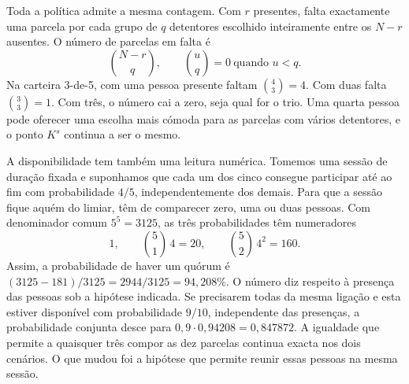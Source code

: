 Toda a política admite a mesma contagem. Com \(r\) presentes, falta
exactamente uma parcela por cada grupo de \(q\) detentores escolhido
inteiramente entre os \(N-r\) ausentes. O número de parcelas em falta é
\[
              \binom{N-r}{q},
       \qquad \binom{u}{q}=0\ \text{quando }u<q .
\]
Na carteira 3-de-5, com uma pessoa presente faltam \(\binom43=4\).
Com duas falta \(\binom33=1\). Com três, o número cai a zero,
seja qual for o trio. Uma quarta pessoa pode oferecer uma escolha
mais cómoda para as parcelas com vários detentores, e o ponto
\(K^s\) continua a ser o mesmo.

A disponibilidade tem também uma leitura numérica. Tomemos uma
sessão de duração fixada e suponhamos que cada um dos cinco consegue
participar até ao fim com probabilidade \(4/5\), independentemente
dos demais. Para que a sessão fique aquém do limiar, têm de comparecer
zero, uma ou duas pessoas. Com denominador comum \(5^5=3125\), as
três probabilidades têm numeradores
\[
             1,\qquad \binom51\,4=20,\qquad
             \binom52\,4^2=160 .
\]
Assim, a probabilidade de haver um quórum é
\((3125-181)/3125=2944/3125=94{,}208\%\).
O número diz respeito à presença das pessoas sob a hipótese indicada.
Se precisarem todas da mesma ligação e esta estiver disponível com
probabilidade \(9/10\), independente das presenças, a probabilidade
conjunta desce para \(0{,}9\cdot0{,}94208=0{,}847872\). A igualdade
que permite a quaisquer três compor as dez parcelas continua exacta
nos dois cenários. O que mudou foi a hipótese que permite reunir
essas pessoas na mesma sessão.
